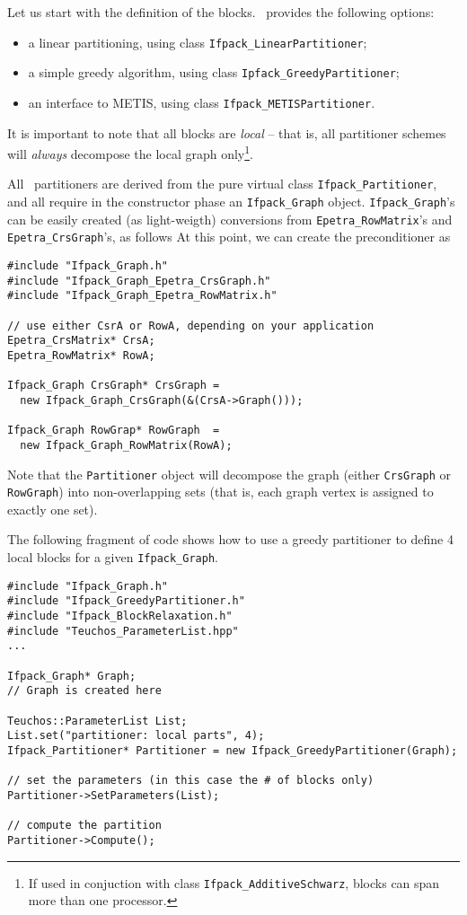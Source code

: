\smallskip

Let us start with the definition of the blocks. 
\ifpack\ provides the following options:
\begin{itemize}
\item a linear partitioning, using class \verb!Ifpack_LinearPartitioner!;
\item a simple greedy algorithm, using class \verb!Ipfack_GreedyPartitioner!;
\item an interface to METIS, using class \verb!Ifpack_METISPartitioner!.
\end{itemize}
It is important to note that all blocks are {\sl local} -- that is, 
  all partitioner schemes will {\sl always} decompose the local graph 
  only\footnote{If used in conjuction with class {\tt Ifpack\_AdditiveSchwarz},
    blocks can span more than one processor.}.

All \ifpack\ partitioners are derived from the pure virtual class
\verb!Ifpack_Partitioner!, and all require in the constructor phase
an \verb!Ifpack_Graph! object. \verb!Ifpack_Graph!'s can be easily
created (as light-weigth) conversions from \verb!Epetra_RowMatrix!'s
and \verb!Epetra_CrsGraph!'s, as follows At this point, we can create the
preconditioner as
\begin{verbatim}
#include "Ifpack_Graph.h"
#include "Ifpack_Graph_Epetra_CrsGraph.h"
#include "Ifpack_Graph_Epetra_RowMatrix.h"

// use either CsrA or RowA, depending on your application
Epetra_CrsMatrix* CrsA;
Epetra_RowMatrix* RowA;

Ifpack_Graph CrsGraph* CrsGraph =
  new Ifpack_Graph_CrsGraph(&(CrsA->Graph()));

Ifpack_Graph RowGrap* RowGraph  =
  new Ifpack_Graph_RowMatrix(RowA);
\end{verbatim}
Note that the \verb!Partitioner! object will decompose the graph (either
\verb!CrsGraph! or \verb!RowGraph!) into
non-overlapping sets (that is, each graph vertex is assigned to exactly one
set).

The following fragment of code shows how to use a greedy partitioner to define
4 local blocks for a given \verb!Ifpack_Graph!.

\begin{verbatim}
#include "Ifpack_Graph.h"
#include "Ifpack_GreedyPartitioner.h"
#include "Ifpack_BlockRelaxation.h"
#include "Teuchos_ParameterList.hpp"
...

Ifpack_Graph* Graph;   
// Graph is created here

Teuchos::ParameterList List;
List.set("partitioner: local parts", 4);
Ifpack_Partitioner* Partitioner = new Ifpack_GreedyPartitioner(Graph);

// set the parameters (in this case the # of blocks only)
Partitioner->SetParameters(List);

// compute the partition
Partitioner->Compute();
\end{verbatim}

